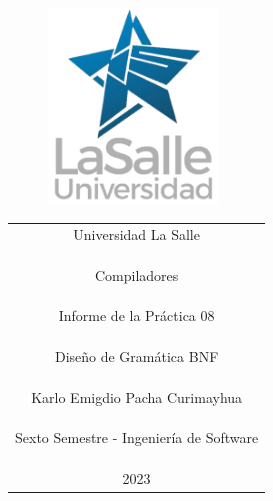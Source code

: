 \documentclass[https://www.overleaf.com/project/63761df255a8a9f4a15c3579
	letterpaper, %
	10pt, %
]{CSUniSchoolLabReport}
\begin{document}
\begin{figure}[H] %
	\centering %
	\includegraphics[width=0.4\textwidth]{images/logo.png} %
\end{figure}

\begin{center}
    \begin{tabular} {c}
        \Huge Universidad La Salle \\\\\\\\
        \huge Compiladores \\\\\\\\
        \LARGE Informe de la Práctica 08 \\\\\\\\
        \huge Diseño de Gramática BNF \\\\\\\\
        \LARGE Karlo Emigdio Pacha Curimayhua \\\\\\\\
        \LARGE Sexto Semestre - Ingeniería de Software \\\\\\\\
        \LARGE 2023
      \end{tabular}
\end{center}

\begin{center}
	\begin{tabular}{l r}
	\end{tabular}
\end{center}
\end{document}
